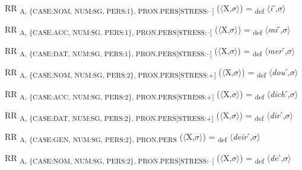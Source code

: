{\begin{exe}
 RR \textsubscript{A, \{CASE:NOM, NUM:SG, PERS:1\}, PRON.PERS[STRESS:–]} ($\langle$X,$\sigma $$\rangle$) = \textsubscript{def} $\langle$\textit{i}ˊ,$\sigma $$\rangle$
\end{exe}

\begin{exe}
 RR \textsubscript{A, \{CASE:ACC, NUM:SG, PERS:1\}, PRON.PERS[STRESS:–]} ($\langle$X,$\sigma $$\rangle$) = \textsubscript{def} $\langle$\textit{mi}ˊ,$\sigma $$\rangle$
\end{exe}

\begin{exe}
 RR \textsubscript{A, \{CASE:DAT, NUM:SG, PERS:1\}, PRON.PERS[STRESS:–]} ($\langle$X,$\sigma $$\rangle$) = \textsubscript{def} $\langle$\textit{mer}ˊ,$\sigma $$\rangle$
\end{exe}

\begin{exe}
 RR \textsubscript{A, \{CASE:NOM, NUM:SG, PERS:2\}, PRON.PERS[STRESS:+]} ($\langle$X,$\sigma $$\rangle$) = \textsubscript{def} $\langle$\textit{dou}ˊ,$\sigma $$\rangle$
\end{exe}

\begin{exe}
 RR \textsubscript{A, \{CASE:ACC, NUM:SG, PERS:2\}, PRON.PERS[STRESS:+]} ($\langle$X,$\sigma $$\rangle$) = \textsubscript{def} $\langle$\textit{dich}ˊ,$\sigma $$\rangle$
\end{exe}

\begin{exe}
 RR \textsubscript{A, \{CASE:DAT, NUM:SG, PERS:2\}, PRON.PERS[STRESS:+]} ($\langle$X,$\sigma $$\rangle$) = \textsubscript{def} $\langle$\textit{dir}ˊ,$\sigma $$\rangle$
\end{exe}

\begin{exe}
 RR \textsubscript{A, \{CASE:GEN, NUM:SG, PERS:2\}, PRON.PERS} ($\langle$X,$\sigma $$\rangle$) = \textsubscript{def} $\langle$\textit{deir}ˊ,$\sigma $$\rangle$
\end{exe}

\begin{exe}
 RR \textsubscript{A, \{CASE:NOM, NUM:SG, PERS:2\}, PRON.PERS[STRESS:–]} ($\langle$X,$\sigma $$\rangle$) = \textsubscript{def} $\langle$\textit{de}ˊ,$\sigma $$\rangle$
\end{exe}

}
